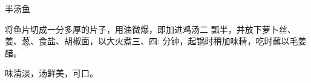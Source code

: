 \begin{recipe}{半汤鱼}

\ingredients


\cooking

将鱼片切成一分多厚的片子，用油微爆，即加进鸡汤二 瓢半，并放下萝卜丝、姜、葱、食盐、胡椒面，以大火煮三、四: 分钟，起锅时稍加味精，吃时蘸以毛姜醋。

\notes

味清淡，汤鲜美，可口。

\end{recipe}

